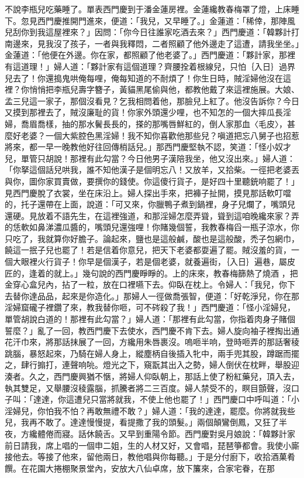 \begin{showcontents}{}
不說李瓶兒吃藥睡了。單表西門慶到于潘金蓮房裡。金蓮纔教春梅罩了燈，上床睡下。忽見西門慶推開門進來，便道：「我兒，又早睡了。」金蓮道：「稀倖，那陣風兒刮你到我這屋裡來？」因問：「你今日往誰家吃酒去來？」西門慶道：「韓夥計打南邊來，見我沒了孩子，一者與我釋悶，二者照顧了他外邊走了這遭，請我坐坐。」金蓮道：「他便在外邊。你在家，都照顧了他老婆了。」西門慶道：「夥計家，那裡有這道理！」婦人道：「夥計家有這個道理？齊腰拴着根線兒，只怕｛入日｝過界兒去了！你還搗鬼哄俺每哩，俺每知道的不耐煩了！你生日時，賊淫婦他沒在這裡？你悄悄把李瓶兒壽字簪子，黃貓黑尾偷與他，都教他戴了來這裡施展。大娘、孟三兒這一家子，那個沒看見？乞我相問着他，那臉兒上紅了。他沒告訴你？今日又摸到那裡去了，賊沒廉耻的貨！你家外頭還少哩，也不知怎的一個大摔瓜長淫婦，喬眉喬樣，抽的那水鬢長長的，搽的那嘴唇鮮紅的，倒人家那血〈毛皮〉，甚麼好老婆？一個大紫腔色黑淫婦！我不知你喜歡他那些兒？嗔道把忘八舅子也招惹將來，都一早一晚教他好往回傳梢話兒。」那西門慶堅執不認，笑道：「怪小奴才兒，單管只胡說！那裡有此勾當？今日他男子漢陪我坐，他又沒出來。」婦人道：「你拏這個話兒哄我，誰不知他漢子是個明忘八！又放羊，又拾柴。一徑把老婆丟與你，圖你家買賣做，要撰你的錢使。你這傻行貨子，是好四十里聽銃响罷了！」見西門慶脫了衣裳，坐在床沿上。婦人探出手來，把褲子扯開，摸見那話軟叮噹的，托子還帶在上面，說道：「可又來，你臘鴨子煮到鍋裡，身子兒爛了，嘴頭兒還硬。見放着不語先生，在這裡強道，和那淫婦怎麼弄聳，聳到這咱晚纔來家？弄的恁軟如鼻涕濃瓜醬的，嘴頭兒還強哩！你賭幾個誓，我教春梅舀一瓶子涼水，你只吃了，我就算你好膽子。論起來，鹽也是這般鹹，酸也是這般酸，禿子包網巾，饒這一抿子兒也罷了！若是信着你意兒，把天下老婆都耍遍了罷。賊沒羞的貨，一個大眼裡火行貨子！你早是個漢子，若是個老婆，就養遍街，｛入日｝遍巷，屬皮匠的，逢着的就上。」幾句說的西門慶睜睜的。上的床來，教春梅篩熱了燒酒 ，把金穿心盒兒內，拈了一粒，放在口裡嚥下去。仰臥在枕上。令婦人：「我兒，你下去替你達品品，起來是你造化。」那婦人一徑做喬張智，便道：「好乾淨兒，你在那淫婦窟礲子裡鑽了來，教我替你咂，可不硶殺了我！」西門慶道：「怪小淫婦兒，單管胡說白道的！那裡有此勾當？」婦人道：「那裡有此勾當，你指着肉身子賭個誓麼？」亂了一回，教西門慶下去使水，西門慶不肯下去。婦人旋向袖子裡掏出通花汗巾來，將那話抹展了一回，方纔用朱唇裹沒。嗚咂半响，登時咂弄的那話奢稜跳腦，暴怒起來，乃騎在婦人身上，縱塵柄自後插入牝中，兩手兜其股，蹲踞而擺之，肆行搧打，連聲响喨。燈光之下，窺翫其出入之勢，婦人倒伏在枕畔，舉股迎湊者。久之，西門慶興猶不愜，將婦人仰臥朝上，那話上使了粉紅藥兒，頂入去，執其雙足，又舉腰沒稜露腦，抓騰者將二三百度。婦人禁受不的，瞑目顫聲，沒口子叫：「達達，你這遭兒只當將就我，不使上他也罷了！」西門慶口中呼叫道：「小淫婦兒，你怕我不怕？再敢無禮不敢？」婦人道：「我的達達，罷麼。你將就我些兒，我再不敢了。達達慢慢提，看提撒了我的頭髮。」兩個顛鸞倒鳳，又狂了半夜，方纔體倦而寢。話休饒舌。又早到重陽令節。西門慶對吳月娘說：「韓夥計家前日請我，席上唱的一個申二姐，生的人材又好，又會唱，琵琶箏都會。我使小廝接他去。等接了他來，留他兩日，教他唱與你每聽。」于是分付廚下，收拾酒菓肴饌。在花園大捲棚聚景堂內，安放大八仙卓席，放下簾來，合家宅眷，在那
\end{showcontents}
